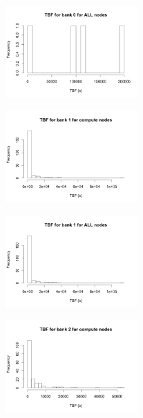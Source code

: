 \begin{t able}[t]
\begin{figure}
\centering
\includegraphics[width=0.45\textwidth]{images/tbf_0_a.png}
\end{figure}

\begin{figure}
\centering
\includegraphics[width=0.45\textwidth]{images/tbf_1_c.png}
\end{figure}

\begin{figure}
\centering
\includegraphics[width=0.45\textwidth]{images/tbf_1_a.png}
\end{figure}

\begin{figure}
\centering
\includegraphics[width=0.45\textwidth]{images/tbf_2_c.png}
\end{figure}


\end{t able}
